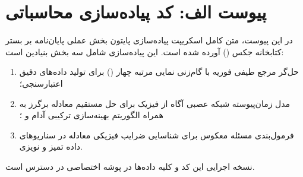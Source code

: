 \chapter*{پیوست الف: کد پیاده‌سازی محاسباتی}
{}

در این پیوست، متن کامل اسکریپت پیاده‌سازی پایتون بخش عملی پایان‌نامه بر بستر کتابخانه جکس () آورده شده است. این پیاده‌سازی شامل سه بخش بنیادین است:
\begin{enumerate}
\item حل‌گر مرجع طیفی فوریه با گام‌زنی نمایی مرتبه چهار () برای تولید داده‌های دقیق اعتبارسنجی؛
\item مدل زمان‌پیوسته شبکه عصبی آگاه از فیزیک برای حل مستقیم معادله برگرز به همراه الگوریتم بهینه‌سازی ترکیبی آدام و ؛
\item فرمول‌بندی مسئله معکوس برای شناسایی ضرایب فیزیکی معادله در سناریوهای داده تمیز و نویزی.
\end{enumerate}

نسخه اجرایی این کد و کلیه داده‌ها در پوشه اختصاصی  در دسترس است.

\begin{latin}

\end{latin}
